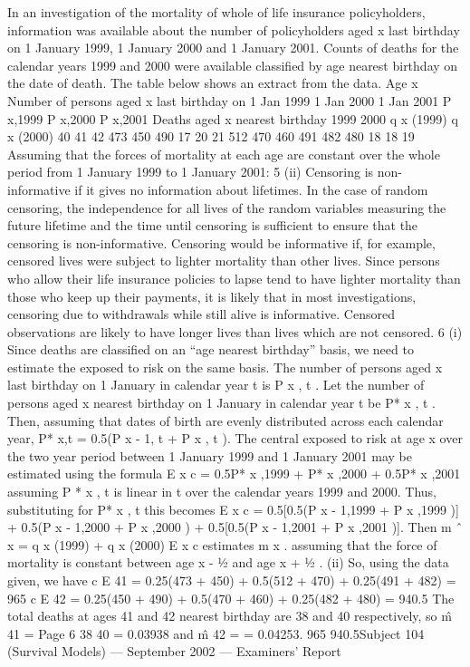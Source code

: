 \documentclass[a4paper,12pt]{article}
\begin{document}
In an investigation of the mortality of whole of life insurance policyholders,
information was available about the number of policyholders aged x last birthday on
1 January 1999, 1 January 2000 and 1 January 2001. Counts of deaths for the
calendar years 1999 and 2000 were available classified by age nearest birthday on the
date of death. The table below shows an extract from the data.
Age
x Number of persons aged x last birthday on
1 Jan 1999
1 Jan 2000
1 Jan 2001
P x,1999
P x,2000
P x,2001 Deaths aged x nearest birthday
1999
2000
q x (1999) q x (2000)
40
41
42 473
450
490 17
20
21
512
470
460
491
482
480
18
18
19
Assuming that the forces of mortality at each age are constant over the whole period
from 1 January 1999 to 1 January 2001:
5
(ii) Censoring is non-informative if it gives no information about lifetimes. In the
case of random censoring, the independence for all lives of the random
variables measuring the future lifetime and the time until censoring is
sufficient to ensure that the censoring is non-informative. Censoring would be
informative if, for example, censored lives were subject to lighter mortality
than other lives. Since persons who allow their life insurance policies to lapse
tend to have lighter mortality than those who keep up their payments, it is
likely that in most investigations, censoring due to withdrawals while still
alive is informative. Censored observations are likely to have longer lives
than lives which are not censored.
6
(i)
Since deaths are classified on an “age nearest birthday” basis, we need to
estimate the exposed to risk on the same basis.
The number of persons aged x last birthday on 1 January in calendar year t is
P x , t . Let the number of persons aged x nearest birthday on 1 January in
calendar year t be P* x , t . Then, assuming that dates of birth are evenly
distributed across each calendar year, P* x,t = 0.5(P x - 1, t + P x , t ).
The central exposed to risk at age x over the two year period between 1
January 1999 and 1 January 2001 may be estimated using the formula
E x c = 0.5P* x ,1999 + P* x ,2000 + 0.5P* x ,2001
assuming P * x , t is linear in t over the calendar years 1999 and 2000.
Thus, substituting for P* x , t this becomes
E x c = 0.5[0.5(P x - 1,1999 + P x ,1999 )] + 0.5(P x - 1,2000 + P x ,2000 )
+ 0.5[0.5(P x - 1,2001 + P x ,2001 )].
Then
m ˆ x =
q x (1999) + q x (2000)
E x c
estimates m x .
assuming that the force of mortality is constant between age x - 1⁄2 and age
x + 1⁄2 .
(ii)
So, using the data given, we have
c
E 41
= 0.25(473 + 450) + 0.5(512 + 470) + 0.25(491 + 482) = 965
c
E 42
= 0.25(450 + 490) + 0.5(470 + 460) + 0.25(482 + 480) = 940.5
The total deaths at ages 41 and 42 nearest birthday are 38 and 40 respectively,
so
m̂ 41 =
Page 6
38
40
= 0.03938 and m̂ 42 =
= 0.04253.
965
940.5Subject 104 (Survival Models) — September 2002 — Examiners’ Report
\end{document}
